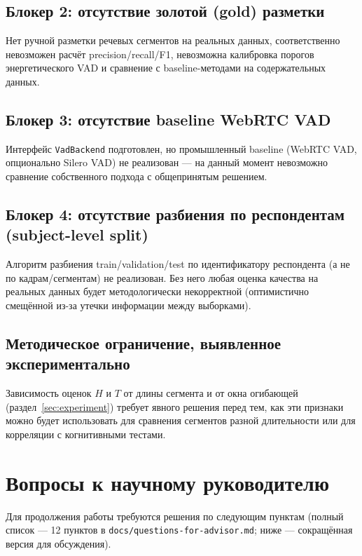 \documentclass[12pt,a4paper]{article}
\begin{document}
\subsection{Блокер 2: отсутствие золотой (gold) разметки}

Нет ручной разметки речевых сегментов на реальных данных, соответственно
невозможен расчёт precision/recall/F1, невозможна калибровка порогов
энергетического VAD и сравнение с baseline-методами на содержательных
данных.

\subsection{Блокер 3: отсутствие baseline WebRTC VAD}

Интерфейс \texttt{VadBackend} подготовлен, но промышленный baseline
(WebRTC VAD, опционально Silero VAD) не реализован — на данный момент
невозможно сравнение собственного подхода с общепринятым решением.

\subsection{Блокер 4: отсутствие разбиения по респондентам (subject-level
split)}

Алгоритм разбиения train/validation/test по идентификатору респондента
(а не по кадрам/сегментам) не реализован. Без него любая оценка качества
на реальных данных будет методологически некорректной (оптимистично
смещённой из-за утечки информации между выборками).

\subsection{Методическое ограничение, выявленное экспериментально}

Зависимость оценок $H$ и $T$ от длины сегмента и от окна огибающей
(раздел~\ref{sec:experiment}) требует явного решения перед тем, как эти
признаки можно будет использовать для сравнения сегментов разной
длительности или для корреляции с когнитивными тестами.

\section{Вопросы к научному руководителю}
\label{sec:questions}

Для продолжения работы требуются решения по следующим пунктам (полный
список — 12 пунктов в \texttt{docs/questions-for-advisor.md}; ниже —
сокращённая версия для обсуждения).
\end{document}
